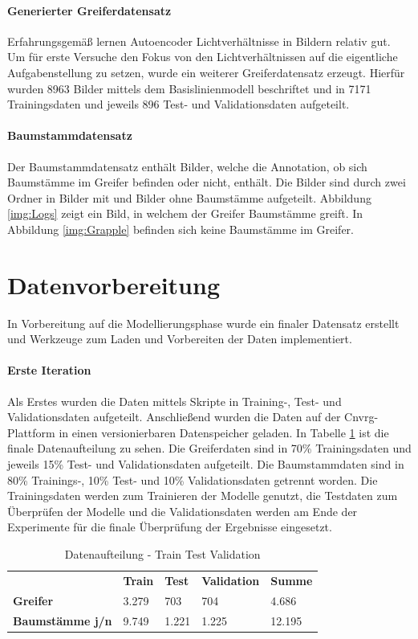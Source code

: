 	\paragraph{Generierter Greiferdatensatz} Erfahrungsgemäß lernen Autoencoder Lichtverhältnisse in Bildern relativ gut. Um für erste Versuche den Fokus von den Lichtverhältnissen auf die eigentliche Aufgabenstellung zu setzen, wurde ein weiterer Greiferdatensatz erzeugt. Hierfür wurden 8963 Bilder mittels dem Basislinienmodell beschriftet und in 7171 Trainingsdaten und jeweils 896 Test- und Validationsdaten aufgeteilt.
	 
	\paragraph{Baumstammdatensatz} Der Baumstammdatensatz enthält Bilder, welche die Annotation, ob sich Baumstämme im Greifer befinden oder nicht, enthält. Die Bilder sind durch zwei Ordner in Bilder mit und Bilder ohne Baumstämme aufgeteilt. Abbildung \ref{img:Logs} zeigt ein Bild, in welchem der Greifer Baumstämme greift. In Abbildung \ref{img:Grapple} befinden sich keine Baumstämme im Greifer.  
			
	\section{Datenvorbereitung}
	\label{sec:DataPreparation}
	In Vorbereitung auf die Modellierungsphase wurde ein finaler Datensatz erstellt und Werkzeuge zum Laden und Vorbereiten der Daten implementiert.
	\paragraph{Erste Iteration} Als Erstes wurden die Daten mittels Skripte in Training-, Test- und Validationsdaten aufgeteilt. Anschließend wurden die Daten auf der Cnvrg-Plattform in einen versionierbaren Datenspeicher geladen. In Tabelle \ref{table:DatenaufteilungTrainTestValidation} ist die finale Datenaufteilung zu sehen. Die Greiferdaten sind in 70\% Trainingsdaten und jeweils 15\% Test- und Validationsdaten aufgeteilt. Die Baumstammdaten sind in 80\% Trainings-, 10\% Test- und 10\% Validationsdaten getrennt worden. Die Trainingsdaten werden zum Trainieren der Modelle genutzt, die Testdaten zum Überprüfen der Modelle und die Validationsdaten werden am Ende der Experimente für die finale Überprüfung der Ergebnisse eingesetzt.
	\begin{table}[ht]
		\centering
		\begin{tabularx}{\textwidth}{lllll}
			& \textbf{Train} & \textbf{Test}  & \textbf{Validation} & \textbf{Summe} 	 \\
			\textbf{Greifer} 				 & 	3.279			& 703	 & 704				   & 4.686 	\\
			\textbf{Baumstämme j/n}	 	  &  9.749	   & 1.221 	& 1.225	& 12.195\\		
		\end{tabularx}
		\caption{Datenaufteilung - Train Test Validation}
		\label{table:DatenaufteilungTrainTestValidation}
	\end{table}
	
